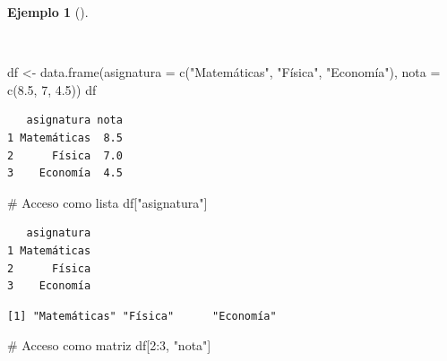 \documentclass[
  spanish,
  a4paper,
]{scrreport}
\newenvironment{Shaded}{\begin{snugshade}}{\end{snugshade}}
\newcommand{\AttributeTok}[1]{\textcolor[rgb]{0.40,0.45,0.13}{#1}}
\newcommand{\CommentTok}[1]{\textcolor[rgb]{0.37,0.37,0.37}{#1}}
\newcommand{\DecValTok}[1]{\textcolor[rgb]{0.68,0.00,0.00}{#1}}
\newcommand{\FloatTok}[1]{\textcolor[rgb]{0.68,0.00,0.00}{#1}}
\newcommand{\FunctionTok}[1]{\textcolor[rgb]{0.28,0.35,0.67}{#1}}
\newcommand{\NormalTok}[1]{\textcolor[rgb]{0.00,0.23,0.31}{#1}}
\newcommand{\OtherTok}[1]{\textcolor[rgb]{0.00,0.23,0.31}{#1}}
\newcommand{\SpecialCharTok}[1]{\textcolor[rgb]{0.37,0.37,0.37}{#1}}
\newcommand{\StringTok}[1]{\textcolor[rgb]{0.13,0.47,0.30}{#1}}
\theoremstyle{definition}
\theoremstyle{definition}
\newtheorem{example}{Ejemplo}[chapter]
\theoremstyle{remark}
\begin{document}
\begin{example}[]\protect\hypertarget{exm-acceso-data-frame}{}\label{exm-acceso-data-frame}

~

\begin{Shaded}
\begin{Highlighting}[]
\NormalTok{df }\OtherTok{\textless{}{-}} \FunctionTok{data.frame}\NormalTok{(}\AttributeTok{asignatura =} \FunctionTok{c}\NormalTok{(}\StringTok{"Matemáticas"}\NormalTok{, }\StringTok{"Física"}\NormalTok{, }\StringTok{"Economía"}\NormalTok{), }\AttributeTok{nota =} \FunctionTok{c}\NormalTok{(}\FloatTok{8.5}\NormalTok{, }\DecValTok{7}\NormalTok{, }\FloatTok{4.5}\NormalTok{))}
\NormalTok{df}
\end{Highlighting}
\end{Shaded}

\begin{verbatim}
   asignatura nota
1 Matemáticas  8.5
2      Física  7.0
3    Economía  4.5
\end{verbatim}

\begin{Shaded}
\begin{Highlighting}[]
\CommentTok{\# Acceso como lista}
\NormalTok{df[}\StringTok{"asignatura"}\NormalTok{]}
\end{Highlighting}
\end{Shaded}

\begin{verbatim}
   asignatura
1 Matemáticas
2      Física
3    Economía
\end{verbatim}

\begin{Shaded}
\end{Shaded}

\begin{verbatim}
[1] "Matemáticas" "Física"      "Economía"   
\end{verbatim}

\begin{Shaded}
\begin{Highlighting}[]
\CommentTok{\# Acceso como matriz}
\NormalTok{df[}\DecValTok{2}\SpecialCharTok{:}\DecValTok{3}\NormalTok{, }\StringTok{"nota"}\NormalTok{]}
\end{Highlighting}
\end{Shaded}


\end{example}
\end{document}
